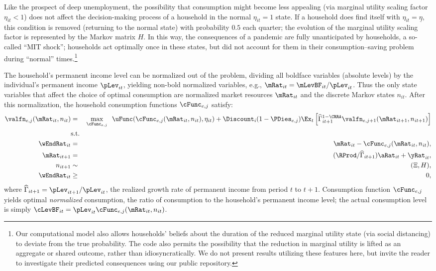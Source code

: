 \documentclass[./ConsumptionResponse]{subfiles}
\begin{document}
Like the prospect of deep unemployment, the possibility that consumption might become less appealing (via marginal utility scaling factor $\eta_{it}<1$) does not affect the decision-making process of a household in the normal $\eta_{it} = 1$ state.
If a household does find itself with $\eta_{it} = \underline{\eta}$, this condition is removed (returning to the normal state) with probability $0.5$ each quarter; the evolution of the marginal utility scaling factor is represented by the Markov matrix $H$.
In this way, the consequences of a pandemic are fully unanticipated by households, a so-called ``MIT shock''; households act optimally once in these states, but did not account for them in their consumption--saving problem during ``normal'' times.\footnote{Our computational model also allows households' beliefs about the duration of the reduced marginal utility state (via social distancing) to deviate from the true probability.  The code also permits the possibility that the reduction in marginal utility is lifted as an aggregate or shared outcome, rather than idiosyncratically.  We do not present results utilizing these features here, but invite the reader to investigate their predicted consequences using our public repository.}

The household's permanent income level can be normalized out of the problem, dividing all boldface variables (absolute levels) by the individual's permanent income $\pLev_{it}$, yielding non-bold normalized variables, e.g., $\mRat_{it} = \mLevBF_{it}/\pLev_{it}$.
Thus the only state variables that affect the choice of optimal consumption are normalized market resources $\mRat_{it}$ and the discrete Markov states $n_{it}$.
After this normalization, the household consumption functions $\cFunc_{e,j}$ satisfy:\\
\begin{eqnarray*}
  \valfn_{e,j}(\mRat_{it}, n_{it})&=&\underset{\cFunc_{e,j}}{\max } ~~ \uFunc(\cFunc_{e,j}(\mRat_{it}, n_{it}), \eta_{it})+\Discount_{i} (1-\PDies_{e,j}) \Ex_{t}\left[ \widehat{\Gamma}_{it+1}^{1-\CRRA} \valfn_{e,j+1}(\mRat_{it+1}, n_{it+1}) \right] \\
  \notag &\text{s.t.}&\\
  \wEndRat_{it} &=&\mRat_{it}-\cFunc_{e,j}(\mRat_{it}, n_{it}),\\
  \mRat_{it+1} &=& (\RProd / \widehat{\Gamma}_{it+1}) \aRat_{it} + \yRat_{it},\\
  n_{it+1} &\sim& (\Xi,H), \\
  \wEndRat_{it} &\geq &0,
\end{eqnarray*}
where $\widehat{\Gamma}_{it+1} = \pLev_{it+1}/\pLev_{it}$, the realized growth rate of permanent income from period $t$ to $t+1$.  Consumption function $\cFunc_{e,j}$ yields optimal \textit{normalized} consumption, the ratio of consumption to the household's permanent income level; the actual consumption level is simply $\cLevBF_{it} = \pLev_{it} \cFunc_{e,j}(\mRat_{it},n_{it})$.
\end{document}
